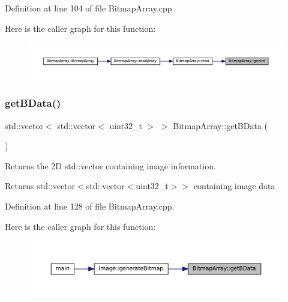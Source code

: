 Definition at line 104 of file Bitmap\+Array.\+cpp.

Here is the caller graph for this function\+:
\nopagebreak
\begin{figure}[H]
\begin{center}
\leavevmode
\includegraphics[width=350pt]{classBitmapArray_a158fbbaa026332a732f644a8c368a2f0_icgraph}
\end{center}
\end{figure}
\mbox{\label{classBitmapArray_a66bd389c357de601df924569a0b38429}} 
\subsubsection{\texorpdfstring{getBData()}{getBData()}}
{\footnotesize\ttfamily std\+::vector$<$ std\+::vector$<$ uint32\+\_\+t $>$ $>$ Bitmap\+Array\+::get\+B\+Data (\begin{DoxyParamCaption}{ }\end{DoxyParamCaption})}



Returns the 2D std\+::vector containing image information. 

\begin{DoxyReturn}{Returns}
std\+::vector$<$std\+::vector$<$uint32\+\_\+t$>$$>$ containing image data 
\end{DoxyReturn}


Definition at line 128 of file Bitmap\+Array.\+cpp.

Here is the caller graph for this function\+:
\nopagebreak
\begin{figure}[H]
\begin{center}
\leavevmode
\includegraphics[width=350pt]{classBitmapArray_a66bd389c357de601df924569a0b38429_icgraph}
\end{center}
\end{figure}
\mbox{\label{classBitmapArray_a60edd8332724d4eb1ca37c91f0fefdc8}} 
